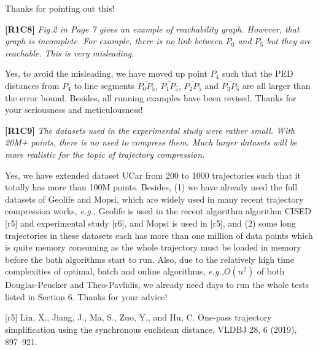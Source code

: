 \documentclass{letter}
\newcommand{\kw}[1]{{\ensuremath {\mathsf{#1}}}\xspace}
\newcommand{\ie}{\emph{i.e.,}\xspace}
\newcommand{\eg}{\emph{e.g.,}\xspace}
\begin{document}
{Thanks for pointing out this!


\textbf{[R1C8]} \emph{ Fig.2 in Page 7 gives an example of reachability graph. However, that graph is incomplete. For example, there is no link between $P_0$ and $P_5$ but they are reachable. This is very misleading. }

Yes, to avoid the misleading, we have moved up point $P_4$ such that the PED distances from $P_4$ to line segments $\overline{P_0P_5}$, $\overline{P_1P_5}$, $\overline{P_2P_5}$ and $\overline{P_3P_5}$ are all larger than the error bound. Besides, all running examples have been revised.
Thanks for your seriousness and meticulousness!






\textbf{[R1C9]} \emph{ The datasets used in the experimental study were rather small. With 20M+ points, there is no need to compress them. Much larger datasets will be more realistic for the topic of trajectory compression.  }

Yes, we have extended dataset UCar from 200 to 1000 trajectories such that it totally has more than {100M} points. Besides, (1) we have already used the full datasets of Geolife and Mopsi, which are widely used in many recent trajectory compression works, \eg Geolife is used in the recent algorithm algorithm CISED [r5] and experimental study [r6], and Mopsi is used in [r5], and (2) some long trajectories in these datasets each has more than {one million} of data points which is quite memory consuming as the whole trajectory must be loaded in memory before the bath algorithms start to run. Also, due to the relatively high time complexities of optimal, batch and online algorithms, \eg $O(n^2)$ of both Douglas-Peucker and Theo-Pavlidis, we already need {days} to run the whole tests listed in Section 6. %
Thanks for your advice!

[r5] Lin, X., Jiang, J., Ma, S., Zuo, Y., and Hu, C. One-pass trajectory simplification using the synchronous euclidean distance. VLDBJ 28, 6 (2019), 897–921.

}
\end{document}

